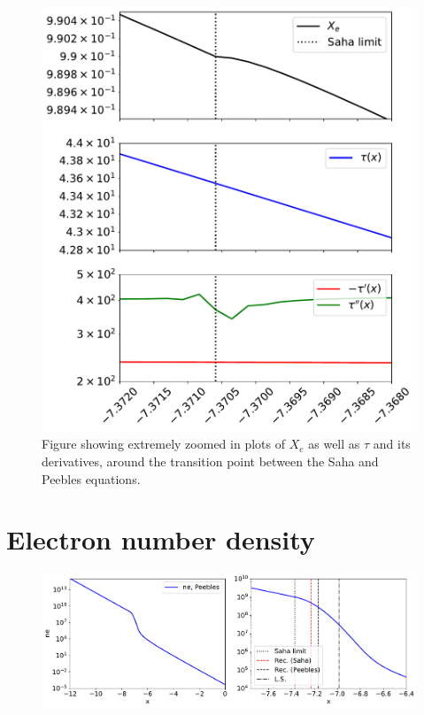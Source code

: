 \documentclass[10pt, a4paper]{article}
\begin{document}
\begin{figure}[H]
    \centering
    \includegraphics[scale=0.5]{../m2_figs/num_stab.pdf}
    \caption{Figure showing extremely zoomed in plots of $X_e$ as well as $\tau$ and its derivatives, around the transition point between the Saha and Peebles equations.}
    \label{fig:num_stab}
\end{figure}



\section{Electron number density} \label{sec:appendixC}
\begin{figure}[H]
    \centering
    \includegraphics[scale=0.5]{../m2_figs/ne.pdf}
    \caption{}
    \label{}
\end{figure}




\end{document}
